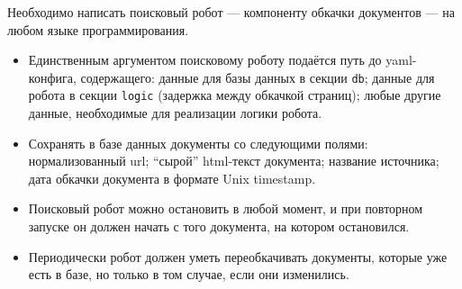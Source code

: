 
Необходимо написать поисковый робот --- компоненту обкачки документов --- на любом языке программирования.
\begin{itemize}
    \item Единственным аргументом поисковому роботу подаётся путь до yaml-конфига, содержащего: данные для базы данных в секции \texttt{db}; данные для робота в секции \texttt{logic} (задержка между обкачкой страниц); любые другие данные, необходимые для реализации логики робота.
    \item Сохранять в базе данных документы со следующими полями: нормализованный url; \enquote{сырой} html-текст документа; название источника; дата обкачки документа в формате Unix timestamp.
    \item Поисковый робот можно остановить в любой момент, и при повторном запуске он должен начать с того документа, на котором остановился.
    \item Периодически робот должен уметь переобкачивать документы, которые уже есть в базе, но только в том случае, если они изменились.
\end{itemize}

\pagebreak
